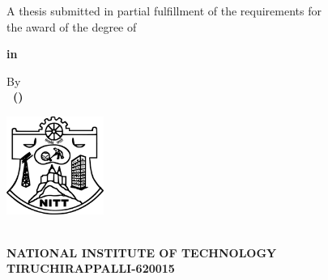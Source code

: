 \begin{titlepage}
\begin{center}
\fontsize{18pt}{1cm}\selectfont \textbf{\MakeUppercase\thetitle}

\vspace*{1.3cm}
\fontsize{14pt}{21pt}\selectfont A thesis submitted in partial fulfillment of the requirements for\\
the award of the degree of

\vspace*{0.4cm}
\fontsize{14pt}{1cm}\selectfont\textbf{\thedegree} 

\vspace*{0.4cm}
\textbf{in\\ \thedepartment}

\vspace*{2.0cm}
By\\
\textbf{\theauthor\ (\therollno)}

\vspace*{2.2cm}
\includegraphics[width=1.25in]{NITT-Logo}


\fontsize{16pt}{16pt}\selectfont \textbf{\MakeUppercase\thedepartment\\NATIONAL INSTITUTE OF TECHNOLOGY\\TIRUCHIRAPPALLI-620015}

\vspace{0.31cm}
\textbf{\MakeUppercase\themonth\ \theyear}
\end{center}
\end{titlepage}
